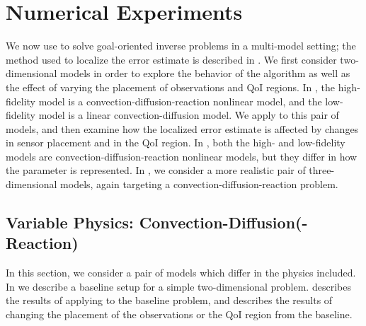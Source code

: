 \documentclass[review,sort&compress]{elsarticle}
\begin{document}
\section{Numerical Experiments}\label{sec:numexp}
%
We now use  to solve goal-oriented inverse problems in a multi-model setting; the method used to localize the error estimate is described in . We first consider two-dimensional models in order to explore the behavior of the algorithm as well as the effect of varying the placement of observations and QoI regions. In , the high-fidelity model is a convection-diffusion-reaction nonlinear model, and the low-fidelity model is a linear convection-diffusion model. We apply  to this pair of models, and then examine how the localized error estimate is affected by changes in sensor placement and in the QoI region. In , both the high- and low-fidelity models are convection-diffusion-reaction nonlinear models, but they differ in how the parameter is represented. In , we consider a more realistic pair of three-dimensional models, again targeting a convection-diffusion-reaction problem.


\subsection{Variable Physics: Convection-Diffusion(-Reaction)} \label{sec:cdvcdr}
In this section, we consider a pair of models which differ in the physics included. In  we describe a baseline setup for a simple two-dimensional problem.  describes the results of applying  to the baseline problem, and  describes the results of changing the placement of the observations or the QoI region from the baseline.
%
\end{document}
